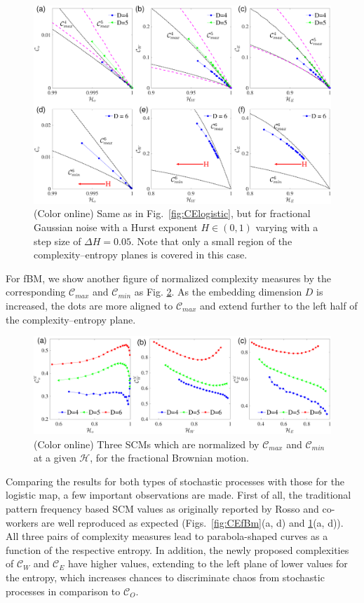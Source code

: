 \documentclass[aip,cha,reprint,nofootinbib]{revtex4-1}
\begin{document}
\begin{figure}
	\centering 
	\includegraphics[width=2\columnwidth]{CompEntropy_fGn.pdf}
\caption{\small{(Color online) Same as in Fig.~\ref{fig:CElogistic}, but for fractional Gaussian noise with a Hurst exponent $H \in (0, 1)$ varying with a step size of $\Delta H=0.05$. Note that only a small region of the complexity--entropy planes is covered in this case. }  \label{fig:CEfGn}}
\end{figure}

{\color{red} For fBM, we show another figure of normalized complexity measures by the corresponding $\mathcal{C}_{max}$ and $\mathcal{C}_{min}$ as Fig. \ref{fig:CHlogCmax}. As the embedding dimension $D$ is increased, the dots are more aligned to $\mathcal{C}_{max}$ and extend further to the left half of the complexity--entropy plane. 
\begin{figure}
        \centering
        \includegraphics[width=2\columnwidth]{CompEntropyCNormalized_fBm.pdf}
\caption{(Color online) Three SCMs which are normalized by $\mathcal{C}_{max}$ and $\mathcal{C}_{min}$  at a given $\mathcal{H}$, for the fractional Brownian motion.  \label{fig:CHlogCmax}}
\end{figure}
}

Comparing the results for both types of stochastic processes with those for the logistic map, a few important observations are made. First of all, the traditional pattern frequency based SCM values as originally reported by Rosso and co-workers \cite{RossoPRE2007,rossoPRL2007} are well reproduced as expected (Figs.~\ref{fig:CEfBm}(a, d) and \ref{fig:CEfGn}(a, d)). {\color{red}All three pairs of complexity measures lead to parabola-shaped curves as a function of the respective entropy. In addition, the newly proposed complexities of $\mathcal{C}_{W}$ and $\mathcal{C}_{E}$ have higher values, extending to the left plane of lower values for the entropy, which increases chances to discriminate chaos from stochastic processes in comparison to $\mathcal{C}_O$. } 
\end{document}
